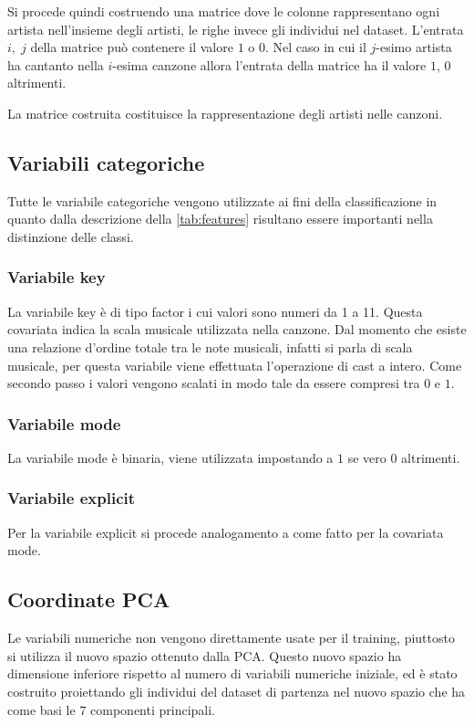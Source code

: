 Si procede quindi costruendo una matrice dove le colonne rappresentano
ogni artista nell'insieme degli artisti, le righe invece gli individui
nel dataset. L'entrata $i,\; j$ della matrice può contenere il valore
$1$ o $0$. Nel caso in cui il $j$-esimo artista ha cantanto nella
$i$-esima canzone allora l'entrata della matrice ha il valore $1$, $0$
altrimenti.

La matrice costruita costituisce la rappresentazione degli artisti
nelle canzoni.

\subsection{Variabili categoriche}
Tutte le variabile categoriche vengono utilizzate ai fini della
classificazione in quanto dalla descrizione della
\autoref{tab:features} risultano essere importanti nella distinzione
delle classi.

\subsubsection{Variabile key}
La variabile key è di tipo factor i cui valori sono numeri da 1 a
11. Questa covariata indica la scala musicale utilizzata nella
canzone. Dal momento che esiste una relazione d'ordine totale tra le
note musicali, infatti si parla di scala musicale, per questa
variabile viene effettuata l'operazione di cast a intero. Come secondo
passo i valori vengono scalati in modo tale da essere compresi tra $0$
e $1$.

\subsubsection{Variabile mode}
La variabile mode è binaria, viene utilizzata impostando a $1$ se vero
$0$ altrimenti.

\subsubsection{Variabile explicit}
Per la variabile explicit si procede analogamento a come fatto per la
covariata mode.

\subsection{Coordinate PCA}
Le variabili numeriche non vengono direttamente usate per il training,
piuttosto si utilizza il nuovo spazio ottenuto dalla PCA. Questo nuovo
spazio ha dimensione inferiore rispetto al numero di variabili
numeriche iniziale, ed è stato costruito proiettando gli individui del
dataset di partenza nel nuovo spazio che ha come basi le $7$
componenti principali.

